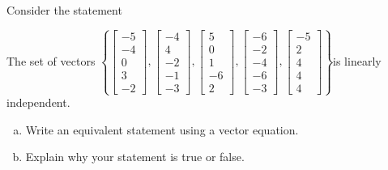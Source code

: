 
\begin{exerciseStatement}


Consider the statement 
\begin{center}\begin{minipage}{0.8\textwidth}
 The set of vectors \( \left\{ \left[\begin{array}{c}
-5 \\
-4 \\
0 \\
3 \\
-2
\end{array}\right] , \left[\begin{array}{c}
-4 \\
4 \\
-2 \\
-1 \\
-3
\end{array}\right] , \left[\begin{array}{c}
5 \\
0 \\
1 \\
-6 \\
2
\end{array}\right] , \left[\begin{array}{c}
-6 \\
-2 \\
-4 \\
-6 \\
-3
\end{array}\right] , \left[\begin{array}{c}
-5 \\
2 \\
4 \\
4 \\
4
\end{array}\right] \right\} \)is linearly independent.
\end{minipage}\end{center}
    


\begin{enumerate}[(a)]
\item  Write an equivalent statement using a vector equation.
\item  Explain why your statement is true or false.
\end{enumerate}
    
\end{exerciseStatement}
    
